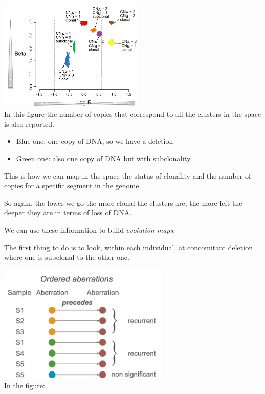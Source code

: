 \includegraphics[width=2.72153in,height=2.08958in]{image3.png}\\

In this figure the number of copies that correspond to all the clusters in the
space is also reported.

\begin{itemize}
\item
  Blue one: one copy of DNA, so we have a deletion
\item
  Green one: also one copy of DNA but with subclonality
\end{itemize}

This is how we can map in the space the status of clonality and the number of
copies for a specific segment in the genome.

So again, the lower we go the more clonal the clusters are, the more left the
deeper they are in terms of loss of DNA.

We can use these information to build \emph{{evolution maps}}.

The first thing to do is to look, within each individual, at concomitant
deletion where one is subclonal to the other one.

\includegraphics[width=3.18859in,height=2.21348in]{image4.png}\\

In the figure:

